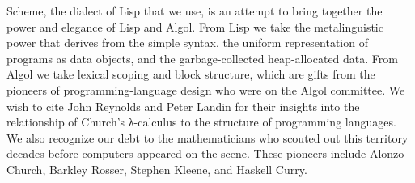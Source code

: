 Scheme, the dialect of Lisp that we use, is an attempt to bring together the
power and elegance of Lisp and Algol.  From Lisp we take the metalinguistic
power that derives from the simple syntax, the uniform representation of
programs as data objects, and the garbage-collected heap-allocated data.  From
Algol we take lexical scoping and block structure, which are gifts from the
pioneers of programming-language design who were on the Algol committee.  We
wish to cite John Reynolds and Peter Landin for their insights into the
relationship of Church's λ-calculus to the structure of programming
languages.  We also recognize our debt to the mathematicians who scouted out
this territory decades before computers appeared on the scene.  These pioneers
include Alonzo Church, Barkley Rosser, Stephen Kleene, and Haskell Curry.
